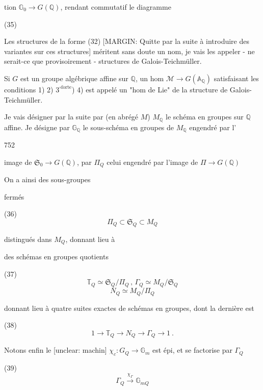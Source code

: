 \newpage


tion $\mathbb{G}_0 \to G(\mathbb{Q})$, rendant commutatif le diagramme

(35)

Les structures de la forme (32) 
[MARGIN: Quitte par la suite à introduire des variantes sur ces structures]
méritent sans doute un nom, je vais les appeler - ne serait-ce que provisoirement - structures de Galois-Teichmüller.

Si $G$ est un groupe algébrique affine sur $\mathbb{Q}$, un hom $\mathcal{M} \to G(\mathbb{A}_{\mathbb{Q}})$ satisfaisant les conditions 1) 2) $3^{\circ \text{forte}}$) 4) est appelé un "hom de Lie" de la structure de Galois-Teichmüller.

Je vais désigner par la suite par (en abrégé $M$) $M_{\mathbb{Q}}$ le schéma en groupes sur $\mathbb{Q}$ affine.
Je désigne par $\mathbb{G}_{\mathbb{Q}}$ le sous-schéma en groupes de $M_{\mathbb{Q}}$ engendré par l'

\newpage


752

image de $\mathfrak{S}_0 \to G(\mathbb{Q})$, par $\Pi_Q$
celui engendré par l'image de $\Pi \to G(\mathbb{Q})$

On a ainsi des sous-groupes

fermés

(36) $$ \Pi_Q \subset \mathfrak{S}_Q \subset M_Q $$

distingués dans $M_Q$, donnant lieu à

des schémas en groupes quotients

(37) $$ \mathbb{T}_Q \simeq \mathfrak{S}_Q / \Pi_Q \, , \, \Gamma_Q \simeq M_Q / \mathfrak{S}_Q $$
$$ N_Q \simeq M_Q / \Pi_Q $$

donnant lieu à quatre suites
exactes de schémas en groupes, dont la
dernière est

(38) $$ 1 \to \mathbb{T}_Q \to N_Q \to \Gamma_Q \to 1 \ . $$

Notons enfin le [unclear: machin] $\chi_c : G_Q \to \mathbb{G}_m$
est épi, et se factorise par $\Gamma_Q$

(39) $$ \Gamma_Q \xrightarrow{\chi_\Gamma} \mathbb{G}_{m Q} $$

